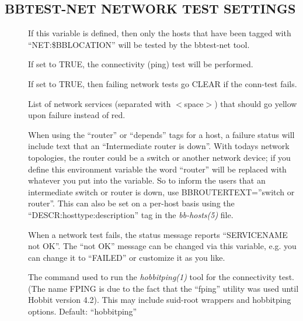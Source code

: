 \subsection{BBTEST-NET NETWORK TEST SETTINGS}


 \begin{description}

\item[] If this variable is defined, then only the
  hosts that have been tagged with ``NET:\$BBLOCATION'' will be tested
  by the bbtest-net tool. 


\item[] If set to TRUE, the connectivity (ping) test will be performed. 

 

\item[] If set to TRUE, then
  failing network tests go CLEAR if the conn-test fails. 


\item[] List of network services (separated with
  $<$space$>$) that should go yellow upon failure instead of red. 


 

\item[] When using the ``router'' or ``depends''
  tags for a host, a failure status will include text that an
  ``Intermediate router is down''. With todays network topologies, the
  router could be a switch or another network device; if you define
  this environment variable the word ``router'' will be replaced with
  whatever you put into the variable. So to inform the users that an
  intermediate switch or router is down, use BBROUTERTEXT=''switch or
  router''. This can also be set on a per-host basis using the
  ``DESCR:hosttype:description'' tag in the \emph{bb-hosts(5)} file. 


 

\item[] When a network test fails, the status
  message reports ``SERVICENAME not OK''. The ``not OK'' message can
  be changed via this variable, e.g. you can change it to ``FAILED''
  or customize it as you like. 


 

\item[] The command used to run the \emph{hobbitping(1)}
  tool for the connectivity test. (The name FPING is due to the fact
  that the ``fping'' utility was used until Hobbit version 4.2). This
  may include suid-root wrappers and hobbitping options. Default:
  ``hobbitping'' 



\end{description}
